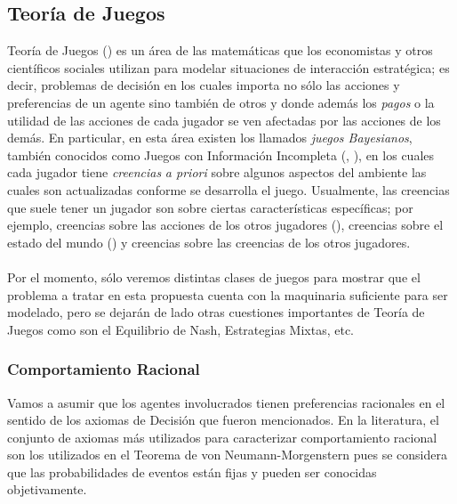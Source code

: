 \documentclass[11pt]{article}
\theoremstyle{plain}
\begin{document}
\subsection{Teoría de Juegos}{\label{juegos}}
Teoría de Juegos (\cite{osborne1994course}) es un área de las matemáticas que los economistas y otros científicos sociales utilizan para modelar situaciones de interacción estratégica; es decir, problemas de decisión en los cuales importa no sólo las acciones y preferencias de un agente sino también de otros y donde además los \textit{pagos} o la utilidad de las acciones de cada jugador se ven afectadas por las acciones de los demás. En particular, en esta área existen los llamados \textit{juegos Bayesianos}, también conocidos como Juegos con Información Incompleta (\cite{osborne1994course}, \cite{10.1007/978-94-010-0189-2_25}),  en los cuales cada jugador tiene \textit{creencias} \textit{a priori} sobre algunos aspectos del ambiente las cuales son actualizadas conforme se desarrolla el juego. Usualmente, las creencias que suele tener un jugador son sobre ciertas características específicas; por ejemplo, creencias sobre las acciones de los otros jugadores (\cite{costa2008stated}), creencias sobre el estado del mundo (\cite{dominitz2009empirical}) y creencias sobre las creencias de los otros jugadores.\\
\\
\indent Por el momento, sólo veremos distintas clases de juegos para mostrar que el problema a tratar en esta propuesta cuenta con la maquinaria suficiente para ser modelado, pero se dejarán de lado otras cuestiones importantes de Teoría de Juegos como son el Equilibrio de Nash, Estrategias Mixtas, etc. 
\subsubsection{Comportamiento Racional}
Vamos a asumir que los agentes involucrados tienen preferencias racionales en el sentido de los axiomas de Decisión que fueron mencionados. En la literatura, el conjunto de axiomas más utilizados para caracterizar comportamiento racional son los utilizados en el Teorema de von Neumann-Morgenstern pues se considera que las probabilidades de eventos están fijas y pueden ser conocidas objetivamente.
\end{document}
